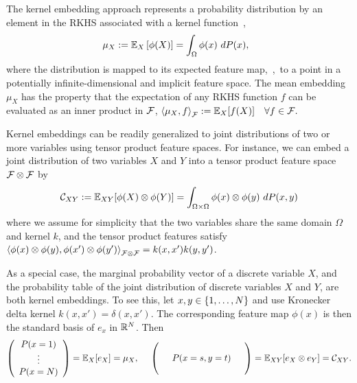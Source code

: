 \documentclass[11pt]{article}
\begin{document}
The kernel embedding approach represents a probability distribution by an element in the RKHS associated with a kernel function~\cite{SmoGreSonSch07,SriGreFukLanetal08},
\begin{align}
  \mu_{X} := \mathbb{E}_{X} \left[\phi(X)\right] = \int_{\Omega} \phi(x) ~dP(x),~~\label{eq:embedding}
\end{align}
where the distribution is mapped to its expected feature map,~\ie,~to a point in a potentially infinite-dimensional and implicit feature space.
 The mean embedding $\mu_{X}$ has the property that the expectation of any RKHS function $f$ can be evaluated as an inner product in $\mathcal{F}$,
$
  \left\langle \mu_{X},f \right\rangle_{\mathcal{F}} := \mathbb{E}_{X} [f(X)] \quad\forall f\in\mathcal{F}.~~\label{eq:embedding2}
$

Kernel embeddings can be readily generalized to joint distributions of two or more variables using tensor product feature spaces. For instance, we can embed a joint distribution of two variables $X$ and $Y$ into a tensor product feature space $\mathcal{F}\otimes \mathcal{F}$ by
\begin{align}
    \mathcal{C}_{XY} := \mathbb{E}_{XY}[\phi(X)\otimes \phi(Y)] = \int_{\Omega \times \Omega} \phi(x) \otimes \phi(y)~d P(x,y)
\end{align}
where we assume for simplicity that the two variables share the same domain $\Omega$ and kernel $k$, and the tensor product features satisfy $\left\langle \phi(x)\otimes \phi(y) ,\phi(x')\otimes \phi(y')  \right\rangle_{\mathcal{F}\otimes \mathcal{F}}=k(x,x')k(y,y')$.

As a special case, the marginal probability vector of a discrete variable $X$, and the probability table of the joint distribution of  discrete variables $X$ and $Y$, are both kernel embeddings. To see this, let $x,y\in \left\{1,\ldots,N\right\}$ and use Kronecker delta kernel $k(x,x') = \delta(x,x')$. The corresponding feature map $\phi(x)$ is then the standard basis of $e_{x}$ in $\mathbb{R}^N$. Then
\begin{align}
    \left(
      \begin{array}{c}
         P(x = 1) \cr
         \vdots \cr
         P(x = N)
       \end{array}
    \right) = \mathbb{E}_X[e_X] = \mu_X,~~~~
    \left(
        \begin{array}{ccc}
            & & \cr
            & P(x=s,y=t) & \cr
            & &
        \end{array}
    \right) = \mathbb{E}_{XY}[e_X \otimes e_Y] = \mathcal{C}_{XY}. \label{eq:jointprobabilitytable}
\end{align}
\end{document}
